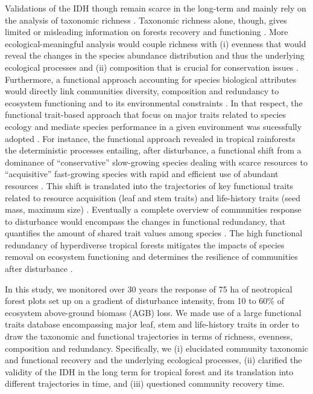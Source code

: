 \documentclass[fleqn,10pt]{ArtEcoFoG} %
\begin{document}
Validations of the IDH though remain scarce in the long-term and mainly
rely on the analysis of taxonomic richness \citep{Molino2001}. Taxonomic
richness alone, though, gives limited or misleading information on
forests recovery and functioning \citep{Chaudhary2016}. More
ecological-meaningful analysis would couple richness with (i) evenness
that would reveal the changes in the species abundance distribution and thus the underlying ecological processes and (ii) composition
that is crucial for conservation issues
\citep{Lavorel2002, Bellwood2006}. Furthermore, a functional approach
accounting for species biological attributes would directly link
communities diversity, composition and redundancy to ecosystem
functioning and to its environmental constraints
\citep{Violle2007b, Baraloto2012a}. In that respect, the functional
trait-based approach that focus on major traits related to species
ecology and mediate species performance in a given environment was
sucessfully adopted \citep{Diaz2005}. For instance, the functional
approach revealed in tropical rainforests the deterministic processes
entailing, after disturbance, a functional shift from a dominance of
``conservative'' slow-growing species dealing with scarce resources to
``acquisitive'' fast-growing species with rapid and efficient use of
abundant resources \citep{Reich2014, Herault2011}. This shift is
translated into the trajectories of key functional traits related to
resource acquisition (leaf and stem traits) and life-history traits
(seed mass, maximum size)
\citep{Wright2004, TerSteege2006, Westoby2006a, Chave2009b}. Eventually
a complete overview of communities response to disturbance would
encompass the changes in functional redundancy, that quantifies the
amount of shared trait values among species \citep{Carmona2016}. The
high functional redundancy of hyperdiverse tropical forests
\citep{Bellwood2006} mitigates the impacts of species removal on
ecosystem functioning and determines the resilience of communities after
disturbance \citep{Elmqvist2003, Diaz2005}.

In this study, we monitored over 30 years the response of 75 ha of
neotropical forest plots set up on a gradient of disturbance intensity,
from 10 to 60\% of ecosystem above-ground biomass (AGB) loss. We made
use of a large functional traits database encompassing major leaf, stem
and life-history traits in order to draw the taxonomic and functional
trajectories in terms of richness, evenness, composition and redundancy.
Specifically, we (i) elucidated community taxonomic and functional
recovery and the underlying ecological processes, (ii) clarified the
validity of the IDH in the long term for tropical forest and its
translation into different trajectories in time, and (iii) questioned
community recovery time.
\end{document}
